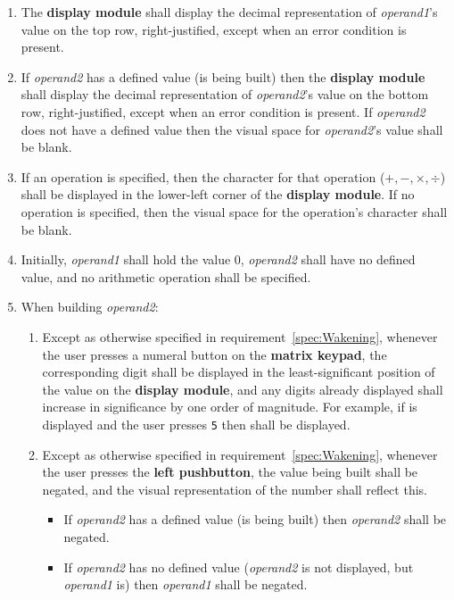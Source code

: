 \begin{enumerate}

\item The \textbf{display module} shall display the decimal representation of \textit{operand1}'s value on the top row, right-justified, except when an error condition is present.
\item If \textit{operand2} has a defined value (is being built) then the \textbf{display module} shall display the decimal representation of \textit{operand2}'s value on the bottom row, right-justified, except when an error condition is present. If \textit{operand2} does not have a defined value then the visual space for \textit{operand2}'s value shall be blank.
\item If an operation is specified, then the character for that operation ($+, -, \times, \div$) shall be displayed in the lower-left corner of the \textbf{display module}. If no operation is specified, then the visual space for the operation's character shall be blank.

\item Initially, \textit{operand1} shall hold the value 0, \textit{operand2}
    shall have no defined value, and no arithmetic operation shall be specified.
\item \label{spec:BuildingValue} When building \textit{operand2}:
    \begin{enumerate}
    \item Except as otherwise specified in requirement~\ref{spec:Wakening},
        whenever the user presses a numeral button on the \textbf{matrix
        keypad}, the corresponding digit shall be displayed in the
        least-significant position of the value on the \textbf{display module},
        and any digits already displayed shall increase in significance by one
        order of magnitude. For example, if  is displayed and the
        user presses \texttt{5} then  shall be displayed.
    \item Except as otherwise specified in requirement~\ref{spec:Wakening},
        whenever the user presses the \textbf{left pushbutton}, the value being
        built shall be negated, and the visual representation of the number shall reflect this.
        \begin{itemize}
        \item If \textit{operand2} has a defined value (is being built) then
            \textit{operand2} shall be negated.
        \item If \textit{operand2} has no defined value (\textit{operand2} is not displayed, but \textit{operand1} is) then \textit{operand1} shall be negated.
        \end{itemize}


\end{enumerate}
\end{enumerate}
